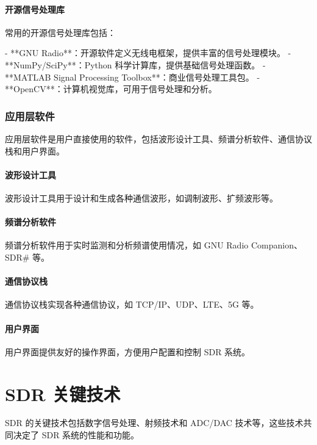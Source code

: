 \documentclass[UTF8]{ctexbook}
\begin{document}
\subsubsection{开源信号处理库}

常用的开源信号处理库包括：

- **GNU Radio**：开源软件定义无线电框架，提供丰富的信号处理模块。
- **NumPy/SciPy**：Python 科学计算库，提供基础信号处理函数。
- **MATLAB Signal Processing Toolbox**：商业信号处理工具包。
- **OpenCV**：计算机视觉库，可用于信号处理和分析。

\subsection{应用层软件}

应用层软件是用户直接使用的软件，包括波形设计工具、频谱分析软件、通信协议栈和用户界面。

\subsubsection{波形设计工具}

波形设计工具用于设计和生成各种通信波形，如调制波形、扩频波形等。

\subsubsection{频谱分析软件}

频谱分析软件用于实时监测和分析频谱使用情况，如 GNU Radio Companion、SDR\# 等。

\subsubsection{通信协议栈}

通信协议栈实现各种通信协议，如 TCP/IP、UDP、LTE、5G 等。

\subsubsection{用户界面}

用户界面提供友好的操作界面，方便用户配置和控制 SDR 系统。

\chapter{SDR 关键技术}

SDR 的关键技术包括数字信号处理、射频技术和 ADC/DAC 技术等，这些技术共同决定了 SDR 系统的性能和功能。
\end{document}
